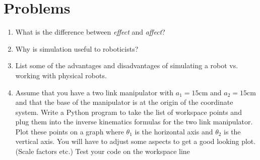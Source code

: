 \hypertarget{problems}{%
\section{Problems}\label{problems}}

\begin{enumerate}
\item
  What is the difference between \emph{effect} and \emph{affect}?
\item
  Why is simulation useful to roboticists?
\item
  List some of the advantages and disadvantages of simulating a robot
  vs. working with physical robots.
\item
  Assume that you have a two link manipulator with \(a_1 = 15\)cm and
  \(a_2 = 15\)cm and that the base of the manipulator is at the origin
  of the coordinate system. Write a Python program to take the list of
  workspace points and plug them into the inverse kinematics formulas
  for the two link manipulator. Plot these points on a graph where
  \(\theta_1\) is the horizontal axis and \(\theta_2\) is the vertical
  axis. You will have to adjust some aspects to get a good looking plot.
  (Scale factors etc.) Test your code on the workspace line


\end{enumerate}
